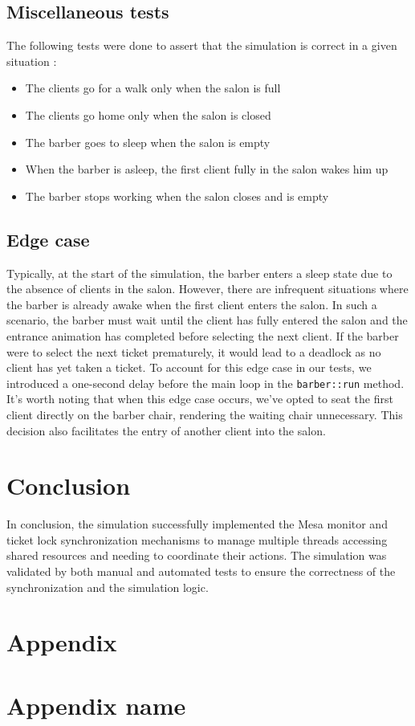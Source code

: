 \documentclass{article}
\begin{document}
    \subsection{Miscellaneous tests}
    The following tests were done to assert that the simulation is correct in a given situation :
    \begin{itemize}
        \item The clients go for a walk only when the salon is full
        \item The clients go home only when the salon is closed
        \item The barber goes to sleep when the salon is empty
        \item When the barber is asleep, the first client fully in the salon wakes him up
        \item The barber stops working when the salon closes and is empty
    \end{itemize}

    \subsection{Edge case}
    Typically, at the start of the simulation, the barber enters a sleep state due to the absence of clients in the salon.
    However, there are infrequent situations where the barber is already awake when the first client enters the salon.
    In such a scenario, the barber must wait until the client has fully entered the salon and the entrance animation has completed before selecting the next client.
    If the barber were to select the next ticket prematurely, it would lead to a deadlock as no client has yet taken a ticket.
    To account for this edge case in our tests, we introduced a one-second delay before the main loop in the \texttt{barber::run} method.
    It's worth noting that when this edge case occurs, we've opted to seat the first client directly on the barber chair, rendering the waiting chair unnecessary.
    This decision also facilitates the entry of another client into the salon.

    \section{Conclusion}
In conclusion, the simulation successfully implemented the Mesa monitor and ticket lock synchronization mechanisms to manage multiple threads accessing shared resources and needing to coordinate their actions.
The simulation was validated by both manual and automated tests to ensure the correctness of the synchronization and the simulation logic.
    \section*{Appendix}

    \section{Appendix name}
\end{document}
